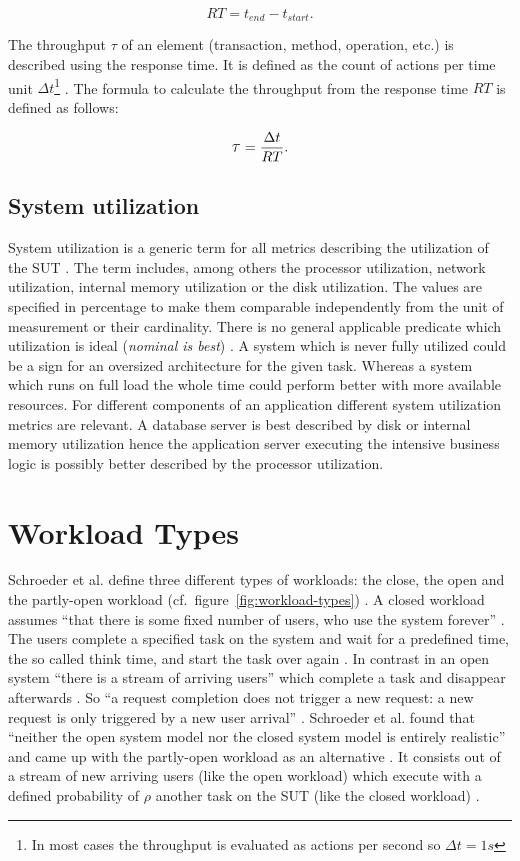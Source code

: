 \[
  RT = t_{end} - t_{start} .
\]

The throughput \large{$\tau$}\normalsize{} of an element (transaction, method, operation, etc.) is described using the response time. It is defined as the count of actions per time unit $\Delta t$\footnote{In most cases the throughput is evaluated as actions per second so $\Delta t = 1s$} \cite[19]{lilja.2005}. The formula to calculate the throughput from the response time $RT$ is defined as follows:

\[
  \mathlarger{\tau} = \frac{\Delta t}{RT} .
\]

\subsection*{System utilization}
System utilization is a generic term for all metrics describing the utilization of the \acf{SUT} \cite[48]{jain.2008}. The term includes, among others the processor utilization, network utilization, internal memory utilization or the disk utilization. The values are specified in percentage to make them comparable independently from the unit of measurement or their cardinality. There is no general applicable predicate which utilization is ideal (\emph{nominal is best}) \cite[54]{jain.2008}. A system which is never fully utilized could be a sign for an oversized architecture for the given task. Whereas a system which runs on full load the whole time could perform better with more available resources. For different components of an application different system utilization metrics are relevant. A database server is best described by disk or internal memory utilization hence the application server executing the intensive business logic is possibly better described by the processor utilization.

\section{Workload Types}
\label{sec:workloads}
Schroeder et al. define three different types of workloads: the close, the open and the partly-open workload (cf.~figure~\ref{fig:workload-types}) \cite{Schroeder.2006}. A closed workload assumes \enquote{that there is some fixed number of users, who use the system forever} \cite[3]{Schroeder.2006}. The users complete a specified task on the system and wait for a predefined time, the so called think time, and start the task over again \cite[3]{Schroeder.2006}. In contrast in an open system \enquote{there is a stream of arriving users} \cite[3]{Schroeder.2006} which complete a task and disappear afterwards \cite[3]{Schroeder.2006}. So
\enquote{a request completion does not trigger a new request: a new request is only triggered by a new user arrival} \cite[3]{Schroeder.2006}. Schroeder et al. found that \enquote{neither the open system model nor the closed system model is entirely realistic} \cite[3]{Schroeder.2006} and came up with the partly-open workload as an alternative \cite[4]{Schroeder.2006}. It consists out of a stream of new arriving users (like the open workload) which execute with a defined probability of $\rho$ another task on the \ac{SUT} (like the closed workload) \cite[3 - 4]{Schroeder.2006}.

